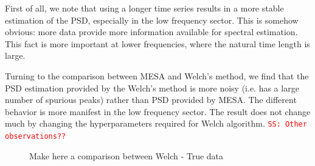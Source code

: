 \documentclass[twocolumn,showpacs,preprintnumbers,nofootinbib,prd,
superscriptaddress,10pt]{revtex4-1}
\newcommand{\sschmidt}[1]{{\textcolor{red}{\texttt{SS: #1}} }}
\begin{document}
First of all, we note that using a longer time series results in a more stable estimation of the PSD, especially in the low frequency sector. This is somehow obvious: more data provide more information available for spectral estimation. This fact is more important at lower frequencies, where the natural time length is large.

Turning to the comparison between MESA and Welch's method, we find that the PSD estimation provided by the Welch's method is more noisy (i.e. has a large number of spurious peaks) rather than PSD provided by MESA. The different behavior is more manifest in the low frequency sector.
The result does not change much by changing the hyperparameters required for Welch algorithm.
\sschmidt{Other observations??}


\begin{figure}
	\label{fig:mem_welch_realdata}
	\caption{Make here a comparison between Welch - True data}

\end{figure}
\end{document}
